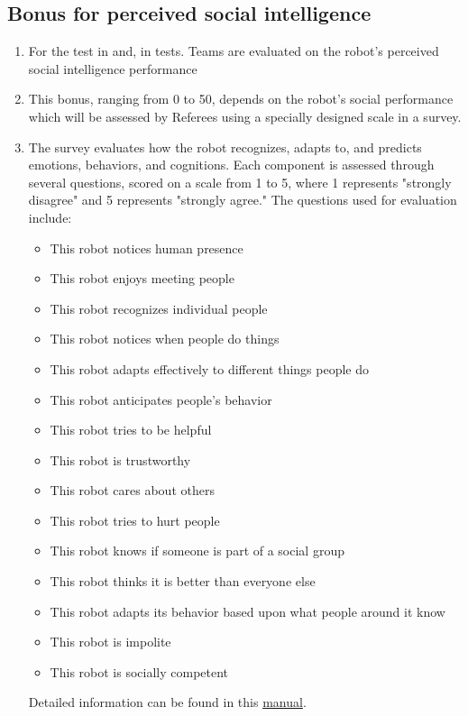 \subsection{Bonus for perceived social intelligence}\label{rule:perceived_intelligence}
\begin{enumerate}	
    \item For the test  in  and,  in  tests. Teams are evaluated on the robot's perceived social intelligence 
     performance
    
    \item This bonus, ranging from 0 to 50, depends on the robot's social performance which will be assessed by Referees using a specially designed scale in a survey.

    \item The survey evaluates how the robot recognizes, adapts to, and predicts emotions, behaviors, and cognitions. Each component is assessed through several questions, scored on a scale from 1 to 5, where 1 represents "strongly disagree" and 5 represents "strongly agree." The questions used for evaluation include:
    \begin{itemize}
        \item This robot notices human presence
        \item This robot enjoys meeting people
        \item This robot recognizes individual people
        \item This robot notices when people do things
        \item This robot adapts effectively to different things people do
        \item This robot anticipates people's behavior
        \item This robot tries to be helpful
        \item This robot is trustworthy
        \item This robot cares about others
        \item This robot tries to hurt people
        \item This robot knows if someone is part of a social group
        \item This robot thinks it is better than everyone else
        \item This robot adapts its behavior based upon what people around it know
        \item This robot is impolite
        \item This robot is socially competent
    \end{itemize}
    Detailed information can be found in this \href{https://ipip.ori.org/PSIManualSeptember2018.pdf}{manual}.
    

\end{enumerate}

